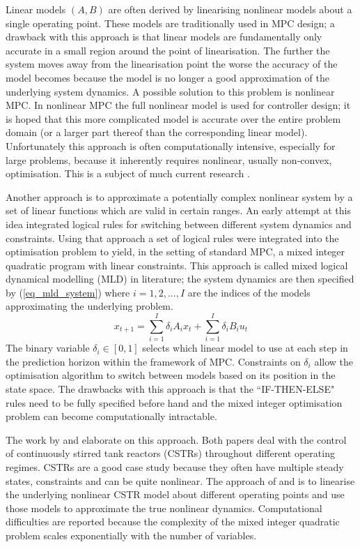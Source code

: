Linear models $(A, B)$ are often derived by linearising nonlinear models about a single operating point. These models are traditionally used in MPC design; a drawback with this approach is that linear models are fundamentally only accurate in a small region around the point of linearisation. The further the system moves away from the linearisation point the worse the accuracy of the model becomes because the model is no longer a good approximation of the underlying system dynamics. A possible solution to this problem is nonlinear MPC. In nonlinear MPC the full nonlinear model is used for controller design; it is hoped that this more complicated model is accurate over the entire problem domain (or a larger part thereof than the corresponding linear model). Unfortunately this approach is often computationally intensive, especially for large problems, because it inherently requires nonlinear, usually non-convex, optimisation. This is a subject of much current research \cite{diehl}. 

Another approach is to approximate a potentially complex nonlinear system by a set of linear functions which are valid in certain ranges. An early attempt at this idea \cite{bemporad} integrated logical rules for switching between different system dynamics and constraints. Using that approach a set of logical rules were integrated into the optimisation problem to yield, in the setting of standard MPC, a mixed integer quadratic program with linear constraints. This approach is called mixed logical dynamical modelling (MLD) in literature; the system dynamics are then specified by (\ref{eq_mld_system}) where $i=1,2,..., I$ are the indices of the models approximating the underlying problem.
\begin{equation}
x_{t+1} = \sum_{i=1}^I \delta_i A_i x_t + \sum_{i=1}^I \delta_i B_i u_t
\label{eq_mld_system}
\end{equation}
The binary variable $\delta_i \in [0, 1]$ selects which linear model to use at each step in the prediction horizon within the framework of MPC. Constraints on $\delta_i$ allow the optimisation algorithm to switch between models based on its position in the state space.  The drawbacks with this approach is that the ``IF-THEN-ELSE" rules need to be fully specified before hand and the mixed integer optimisation problem can become computationally intractable. 

The work by \cite{du} and \cite{sakakura} elaborate on this approach. Both papers deal with the control of continuously stirred tank reactors (CSTRs) throughout different operating regimes. CSTRs are a good case study because they often have multiple steady states, constraints and can be quite nonlinear. The approach of \cite{du} and \cite{sakakura} is to linearise the underlying nonlinear CSTR model about different operating points and use those models to approximate the true nonlinear dynamics. Computational difficulties are reported because the complexity of the mixed integer quadratic problem scales exponentially with the number of variables.

